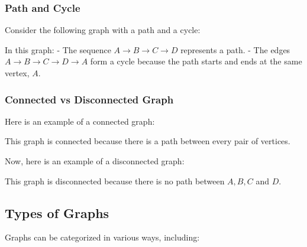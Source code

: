 \documentclass{book}
\begin{document}
\subsubsection{Path and Cycle}
Consider the following graph with a path and a cycle:


In this graph:
- The sequence \(A \rightarrow B \rightarrow C \rightarrow D\) represents a path.
- The edges \(A \rightarrow B \rightarrow C \rightarrow D \rightarrow A\) form a cycle because the path starts and ends at the same vertex, \(A\).

\subsubsection{Connected vs Disconnected Graph}
Here is an example of a connected graph:


This graph is connected because there is a path between every pair of vertices.

Now, here is an example of a disconnected graph:


This graph is disconnected because there is no path between \(A, B, C\) and \(D\).


\subsection{Types of Graphs}

Graphs can be categorized in various ways, including:
\end{document}
